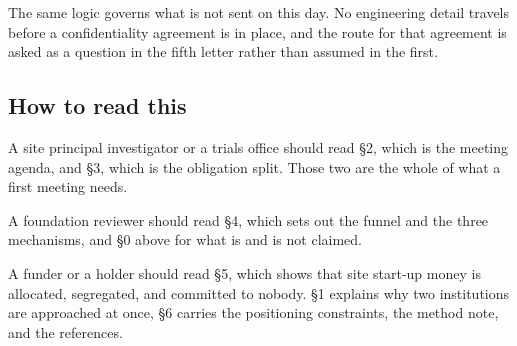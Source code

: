 The same logic governs what is not sent on this day. No engineering detail
travels before a confidentiality agreement is in place, and the route for that
agreement is asked as a question in the fifth letter rather than assumed in the
first.

\subsection{How to read this}

A site principal investigator or a trials office should read \S2, which is the
meeting agenda, and \S3, which is the obligation split. Those two are the whole
of what a first meeting needs.

A foundation reviewer should read \S4, which sets out the funnel and the three
mechanisms, and \S0 above for what is and is not claimed.

A funder or a holder should read \S5, which shows that site start-up money is
allocated, segregated, and committed to nobody. \S1 explains why two institutions
are approached at once, \S6 carries the positioning constraints, the method note,
and the references.
